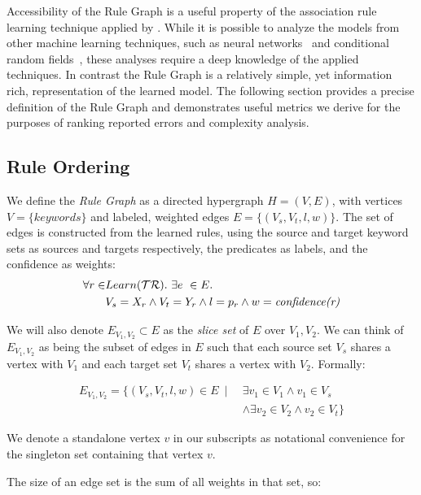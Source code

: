 Accessibility of the Rule Graph is a useful property of the association 
rule learning technique applied by \app.
While it is possible to analyze the models from other machine learning techniques, such as neural networks~\cite{lei2016rationalizing} and
conditional random fields~\cite{raychev2015predicting}, these analyses require a deep knowledge of the applied techniques.
In contrast the Rule Graph is a relatively simple, yet information rich, representation of the learned model.
The following section provides a precise definition of the Rule Graph
and demonstrates useful metrics we derive for the purposes of ranking reported errors
and complexity analysis.

\subsection{Rule Ordering}
\label{sec:ruleorder}

We define the \textit{Rule Graph} as a directed hypergraph $H = (V,E)$,
   with vertices $V = \{ keywords \}$ and labeled, weighted edges $E = \{ (V_s, V_t, l, w) \}$.
The set of edges is constructed from the learned rules, using the source and target keyword sets as sources and targets respectively, the predicates as labels, and the confidence as weights:
%
\begin{align*}
\forall r \in & Learn(\mathcal{TR}).\ \exists e\ \in E.\\
              & V_s = X_r \land V_t=Y_r \land l=p_r \land w =
\textit{confidence(r)}
\end{align*}

We will also denote $E_{V_1, V_2} \subset E$ as the \textit{slice set} 
of $E$ over $V_1, V_2$.
We can think of $E_{V_1, V_2}$ as being the subset of edges in $E$ 
such that each source set $V_s$ shares a vertex with $V_1$
and each target set $V_t$ shares a vertex with $V_2$.
Formally: 

\begin{align*}
    E_{V_1, V_2} = \{ \left( V_s, V_t, l, w \right) \in E \ \mid \ & \exists v_1 \in V_1 \land v_1 \in V_s \\
    & \land \exists v_2 \in V_2 \land v_2 \in V_t \}
\end{align*}


We denote a standalone vertex $v$ in our subscripts as notational 
convenience for the singleton set containing that vertex $v$.

The size of an edge set is the sum of all weights in that set, so:

